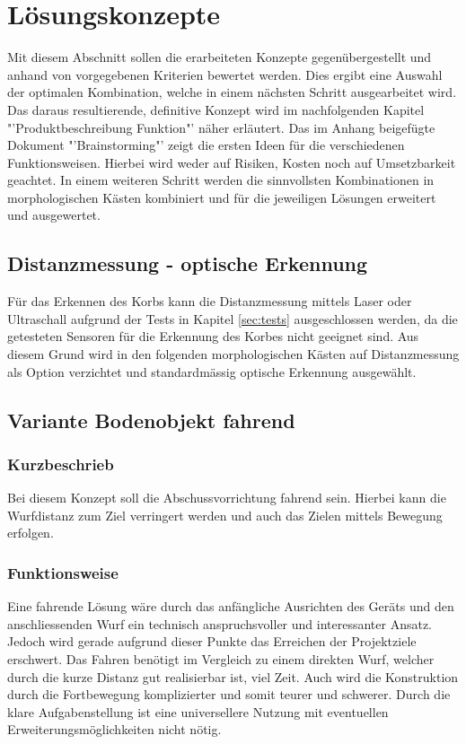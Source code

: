 \newcommand{\morphcellwidth}
{
0.10\linewidth
}
\section{Lösungskonzepte}
Mit diesem Abschnitt sollen die erarbeiteten Konzepte gegenübergestellt und 
anhand von vorgegebenen Kriterien bewertet werden. Dies ergibt eine 
Auswahl der optimalen Kombination, welche in einem nächsten Schritt 
ausgearbeitet wird. Das daraus resultierende, definitive Konzept wird im 
nachfolgenden Kapitel "'Produktbeschreibung Funktion"' näher erläutert. 
Das im Anhang beigefügte Dokument "'Brainstorming"' zeigt die ersten Ideen für 
die verschiedenen Funktionsweisen. Hierbei wird weder auf Risiken, Kosten 
noch auf Umsetzbarkeit geachtet. In einem weiteren Schritt werden die 
sinnvollsten Kombinationen in morphologischen Kästen kombiniert und für die 
jeweiligen Lösungen erweitert und ausgewertet. 

\subsection{Distanzmessung - optische Erkennung}
Für das Erkennen des Korbs kann die Distanzmessung mittels Laser oder Ultraschall 
aufgrund der Tests in Kapitel \ref{sec:tests} ausgeschlossen werden, da die 
getesteten Sensoren für die Erkennung des Korbes nicht geeignet sind. 
Aus diesem Grund wird in den folgenden morphologischen Kästen auf 
Distanzmessung als Option verzichtet und standardmässig 
optische Erkennung ausgewählt.

\subsection{Variante Bodenobjekt fahrend}
\subsubsection{Kurzbeschrieb}
Bei diesem Konzept soll die Abschussvorrichtung fahrend sein. Hierbei kann 
die  Wurfdistanz zum Ziel verringert werden und auch das Zielen mittels 
Bewegung erfolgen.

\subsubsection{Funktionsweise}
Eine fahrende Lösung wäre durch das anfängliche Ausrichten des Geräts und 
den anschliessenden Wurf ein technisch anspruchsvoller und interessanter 
Ansatz. Jedoch wird gerade aufgrund dieser Punkte das Erreichen der 
Projektziele erschwert. Das Fahren benötigt im Vergleich zu einem direkten 
Wurf, welcher durch die kurze Distanz gut realisierbar ist, viel Zeit. Auch 
wird die Konstruktion durch die Fortbewegung komplizierter und somit 
teurer und schwerer. Durch die klare Aufgabenstellung ist eine 
universellere Nutzung mit eventuellen Erweiterungsmöglichkeiten nicht nötig. 

